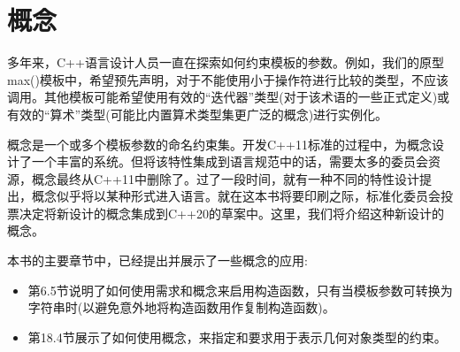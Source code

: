\chapter{概念}
多年来，C++语言设计人员一直在探索如何约束模板的参数。例如，我们的原型max()模板中，希望预先声明，对于不能使用小于操作符进行比较的类型，不应该调用。其他模板可能希望使用有效的“迭代器”类型(对于该术语的一些正式定义)或有效的“算术”类型(可能比内置算术类型集更广泛的概念)进行实例化。

概念是一个或多个模板参数的命名约束集。开发C++11标准的过程中，为概念设计了一个丰富的系统。但将该特性集成到语言规范中的话，需要太多的委员会资源，概念最终从C++11中删除了。过了一段时间，就有一种不同的特性设计提出，概念似乎将以某种形式进入语言。就在这本书将要印刷之际，标准化委员会投票决定将新设计的概念集成到C++20的草案中。这里，我们将介绍这种新设计的概念。

本书的主要章节中，已经提出并展示了一些概念的应用:

\begin{itemize}
\item 
第6.5节说明了如何使用需求和概念来启用构造函数，只有当模板参数可转换为字符串时(以避免意外地将构造函数用作复制构造函数)。

\item 
第18.4节展示了如何使用概念，来指定和要求用于表示几何对象类型的约束。
\end{itemize}



